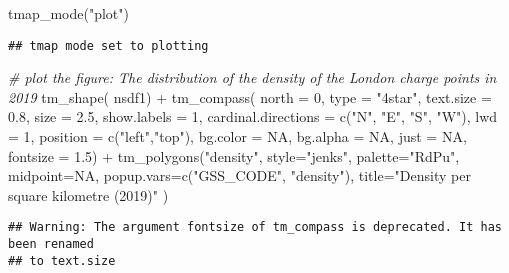 \documentclass[
]{book}
\newenvironment{Shaded}{\begin{snugshade}}{\end{snugshade}}
\newcommand{\AttributeTok}[1]{\textcolor[rgb]{0.77,0.63,0.00}{#1}}
\newcommand{\CommentTok}[1]{\textcolor[rgb]{0.56,0.35,0.01}{\textit{#1}}}
\newcommand{\ConstantTok}[1]{\textcolor[rgb]{0.00,0.00,0.00}{#1}}
\newcommand{\DecValTok}[1]{\textcolor[rgb]{0.00,0.00,0.81}{#1}}
\newcommand{\FloatTok}[1]{\textcolor[rgb]{0.00,0.00,0.81}{#1}}
\newcommand{\FunctionTok}[1]{\textcolor[rgb]{0.00,0.00,0.00}{#1}}
\newcommand{\NormalTok}[1]{#1}
\newcommand{\SpecialCharTok}[1]{\textcolor[rgb]{0.00,0.00,0.00}{#1}}
\newcommand{\StringTok}[1]{\textcolor[rgb]{0.31,0.60,0.02}{#1}}
\begin{document}
\begin{Shaded}
\begin{Highlighting}[]
\FunctionTok{tmap\_mode}\NormalTok{(}\StringTok{"plot"}\NormalTok{)}
\end{Highlighting}
\end{Shaded}

\begin{verbatim}
## tmap mode set to plotting
\end{verbatim}

\begin{Shaded}
\begin{Highlighting}[]
\CommentTok{\# plot the figure: The distribution of the density of the London charge points in 2019}
\FunctionTok{tm\_shape}\NormalTok{( nsdf1) }\SpecialCharTok{+}
  \FunctionTok{tm\_compass}\NormalTok{( }\AttributeTok{north =} \DecValTok{0}\NormalTok{,}
              \AttributeTok{type =} \StringTok{"4star"}\NormalTok{,}
              \AttributeTok{text.size =} \FloatTok{0.8}\NormalTok{,}
              \AttributeTok{size =} \FloatTok{2.5}\NormalTok{,}
              \AttributeTok{show.labels =} \DecValTok{1}\NormalTok{,}
              \AttributeTok{cardinal.directions =} \FunctionTok{c}\NormalTok{(}\StringTok{"N"}\NormalTok{, }\StringTok{"E"}\NormalTok{, }\StringTok{"S"}\NormalTok{, }\StringTok{"W"}\NormalTok{),}
              \AttributeTok{lwd =} \DecValTok{1}\NormalTok{,}
              \AttributeTok{position =} \FunctionTok{c}\NormalTok{(}\StringTok{"left"}\NormalTok{,}\StringTok{"top"}\NormalTok{),}
              \AttributeTok{bg.color =} \ConstantTok{NA}\NormalTok{,}
              \AttributeTok{bg.alpha =} \ConstantTok{NA}\NormalTok{,}
              \AttributeTok{just =} \ConstantTok{NA}\NormalTok{,}
              \AttributeTok{fontsize =} \FloatTok{1.5}\NormalTok{) }\SpecialCharTok{+}
  \FunctionTok{tm\_polygons}\NormalTok{(}\StringTok{"density"}\NormalTok{,}
              \AttributeTok{style=}\StringTok{"jenks"}\NormalTok{,}
              \AttributeTok{palette=}\StringTok{"RdPu"}\NormalTok{,}
              \AttributeTok{midpoint=}\ConstantTok{NA}\NormalTok{,}
              \AttributeTok{popup.vars=}\FunctionTok{c}\NormalTok{(}\StringTok{"GSS\_CODE"}\NormalTok{, }\StringTok{"density"}\NormalTok{),}
              \AttributeTok{title=}\StringTok{"Density per square kilometre (2019)"}
\NormalTok{              )}
\end{Highlighting}
\end{Shaded}

\begin{verbatim}
## Warning: The argument fontsize of tm_compass is deprecated. It has been renamed
## to text.size
\end{verbatim}
\end{document}

